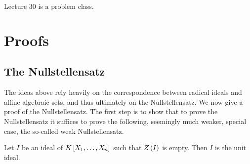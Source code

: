 
Lecture 30 is a problem class.

\pagebreak

\appendix

\section{Proofs}

\subsection{The Nullstellensatz}

The ideas above rely heavily on the correspondence between radical ideals and affine algebraic sets, and thus ultimately on the Nullstellensatz. We now give a proof of the Nullstellensatz. The first step is to show that to prove the Nullstellensatz it suffices to prove the following, seemingly much weaker, special case, the so-called weak Nullstellensatz.

\begin{theorem}
\label{thm:13.3.1}
Let $ I $ be an ideal of $ K\sbr{X_1, \dots, X_n} $ such that $ Z\br{I} $ is empty. Then $ I $ is the unit ideal.
\end{theorem}

